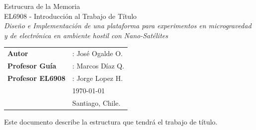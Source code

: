 \documentclass[11pt,letterpaper]{article}
\begin{document}
\newpage
\pagestyle{fancy}
\fancyhf{}
\vspace*{6cm}
\begin{center}
\Huge  {Estrucura de la Memoria} \\
\vspace{1cm}
\LARGE {EL6908 - Introducción al Trabajo de Título}\\
\vspace{0.5cm}
\LARGE {\textit{Diseño e Implementación de una plataforma para experimentos en microgravedad y de electrónica en ambiente hostil con Nano-Sat\'elites}}\\
\end{center}
\vfill
\begin{flushright}
\begin{tabular}{ll}
\textbf{Autor} &: Jos\'e Ogalde O.\\
\textbf{Profesor Guía} &: Marcos Díaz Q.\\
\textbf{Profesor EL6908} &: Jorge Lopez H.\\
& \today\\
& Santiago, Chile.
\end{tabular}
\end{flushright}

\newpage
\pagestyle{fancy}
\fancyhf{}
\fancyhead[R]{\small \rm \textbf{\thepage}}
\renewcommand{\sectionmark}[1]{\markright{\thesection.\ #1}}
\renewcommand{\headrulewidth}{0.5pt}
\renewcommand{\footrulewidth}{0.5pt}


\tableofcontents

\newpage

Este documento describe la estructura que tendrá el trabajo de título.
\end{document}
